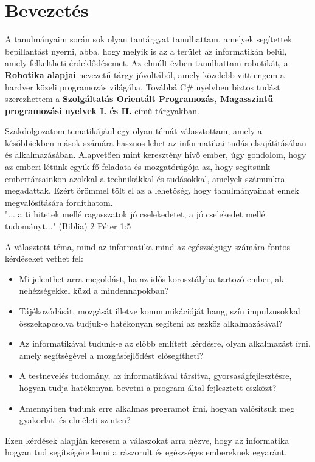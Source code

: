 \documentclass[tocnopagenum]{thesis-ekf}
\theoremstyle{definition}
\theoremstyle{remark}
\begin{document}
	\chapter{Bevezetés}
	\par
	A tanulmányaim során sok olyan tantárgyat tanulhattam, amelyek segítettek bepillantást nyerni, abba, hogy melyik is az a terület az informatikán belül, amely felkeltheti érdeklődésemet. Az elmúlt évben tanulhattam robotikát, a \textbf{Robotika alapjai} nevezetű tárgy jóvoltából, amely közelebb vitt engem a hardver közeli programozás világába. Továbbá C\# nyelvben biztos tudást szerezhettem a \textbf{Szolgáltatás Orientált Programozás, Magasszintű programozási nyelvek I. és II.} című tárgyakban.
	\par
	Szakdolgozatom tematikájául egy olyan témát választottam, amely a későbbiekben mások számára hasznos lehet az informatikai tudás elsajátításában és alkalmazásában.
	Alapvetően mint keresztény hívő ember, úgy gondolom, hogy az emberi létünk egyik fő feladata és mozgatórúgója az, hogy segítsünk embertársainkon azokkal a technikákkal és tudásokkal, amelyek számunkra megadattak. Ezért örömmel tölt el az a lehetőség, hogy tanulmányaimat ennek megvalósítására fordíthatom.\\
	 "... a ti hitetek mellé ragasszatok jó cselekedetet, a jó cselekedet mellé tudományt..." (Biblia) 2 Péter 1:5
	\par
	A választott téma, mind az informatika mind az egészségügy számára fontos kérdéseket vethet fel:
	\begin{itemize}
		\item  Mi jelenthet arra megoldást, ha az idős korosztályba tartozó ember, aki nehézségekkel küzd a mindennapokban? 
		\item Tájékozódását, mozgását illetve kommunikációját hang, szín impulzusokkal összekapcsolva tudjuk-e hatékonyan segíteni az eszköz alkalmazásával?
		\item  Az informatikával tudunk-e az előbb említett kérdésre, olyan alkalmazást írni, amely segítségével a mozgásfejlődést elősegítheti?
		\item A testnevelés tudomány, az informatikával társítva, gyorsaságfejlesztésre, hogyan tudja hatékonyan bevetni a program által fejlesztett eszközt?
		\item Amennyiben tudunk erre alkalmas programot írni, hogyan valósítsuk meg gyakorlati és elméleti szinten?
	\end{itemize}
 	Ezen kérdések alapján keresem a válaszokat arra nézve, hogy az informatika hogyan tud segítségére lenni a rászorult és egészséges embereknek egyaránt. 
 
\end{document}
